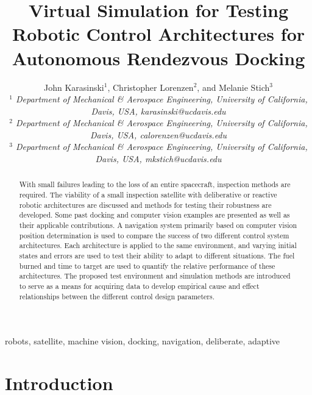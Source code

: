 \documentclass[journal, 10pt]{IEEEtran}
\begin{document}
\title{Virtual Simulation for Testing Robotic Control Architectures for Autonomous Rendezvous Docking }

\author{John Karasinski$^1$, Christopher Lorenzen$^2$, and Melanie Stich$^3$\\\textit{$^1$ Department of Mechanical \& Aerospace Engineering, University of California, Davis, USA, karasinski@ucdavis.edu}
\\\textit{$^2$ Department of Mechanical \& Aerospace Engineering, University of California, Davis, USA, calorenzen@ucdavis.edu}\\\textit{$^3$ Department of Mechanical \& Aerospace Engineering, University of California, Davis, USA, mkstich@ucdavis.edu}
}

\maketitle

\begin{abstract}
With small failures leading to the loss of an entire spacecraft, inspection methods are required.  The viability of a small inspection satellite with deliberative or reactive robotic architectures are discussed and methods for testing their robustness are developed.  Some past docking and computer vision examples are presented as well as their applicable contributions.  A navigation system primarily based on computer vision position determination is used to compare the success of two different control system architectures.  Each architecture is applied to the same environment, and varying initial states and errors are used to test their ability to adapt to different situations.  The fuel burned and time to target are used to quantify the relative performance of these architectures.  The proposed test environment and simulation methods are introduced to serve as a means for acquiring data to develop empirical cause and effect relationships between the different control design parameters.
\end{abstract}

\begin{IEEEkeywords}
robots, satellite, machine vision, docking, navigation, deliberate, adaptive
\end{IEEEkeywords}


\section{Introduction}
\end{document}
